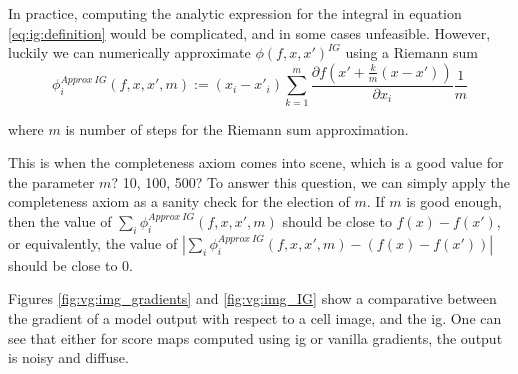 In practice, computing the analytic expression for the integral in equation \ref{eq:ig:definition} would be complicated, and in some cases unfeasible.
However, luckily we can numerically approximate $\phi(f, x, x')^{IG}$ using a Riemann sum
\begin{equation}
  \phi^{Approx\ IG}_i(f, x, x', m) := (x_{i} - x'_{i})\sum_{k=1}^m\frac{\partial f(x'+\frac{k}{m} (x - x'))}{\partial x_i} \frac{1}{m}
  \label{eq:ig:approx}
\end{equation}

\noindent where $m$ is number of steps for the Riemann sum approximation.

This is when the completeness axiom comes into scene, which is a good value for the parameter $m$? 10, 100, 500? To answer this question, we can simply apply the completeness axiom as a sanity check for the election of $m$. If $m$ is good enough, then the value of $\sum_i \phi^{Approx\ IG}_i(f, x, x', m)$ should be close to $f(x)-f(x')$, or equivalently, the value of $|\sum_i \phi^{Approx\ IG}_i(f, x, x', m) - (f(x)-f(x'))|$ should be close to 0.

Figures \ref{fig:vg:img_gradients} and \ref{fig:vg:img_IG} show a comparative between the gradient of a model output with respect to a cell image, and the \gls{ig}. One can see that either for score maps computed using \gls{ig} or vanilla gradients, the output is noisy and diffuse.
